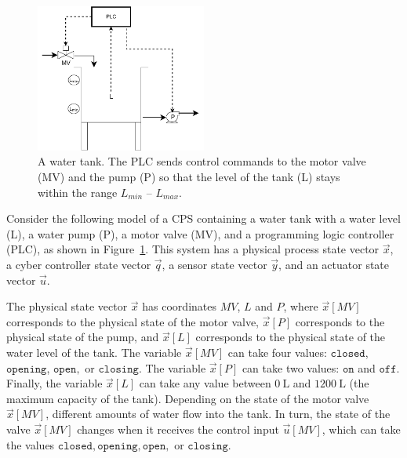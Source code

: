 \begin{figure}
  \centering
  \includegraphics[width=0.50\textwidth]{Figures/FillingTank.pdf}
  \caption{A water tank. The PLC sends control commands to the motor valve (MV) and the pump (P) so that the level of the tank (L) stays within the range $L_{min}$ -- $L_{max}$. }
  \label{fig:CPSRobustness:Motivational}
\end{figure}
Consider the following model of a CPS containing a water tank with a water level (L), a water pump (P), a motor valve (MV), and a programming logic controller (PLC), as shown in Figure~\ref{fig:CPSRobustness:Motivational}. This system has a physical process state vector $\vec{x}$, a cyber controller state vector $\vec{q}$, a sensor state vector $\vec{y}$, and an actuator state vector $\vec{u}$.

The physical state vector $\vec{x}$ has coordinates $MV$, $L$ and $P$, where $\vec{x}[MV]$ corresponds to the physical state of the motor valve, $\vec{x}[P]$ corresponds to the physical state of the pump, and $\vec{x}[L]$  corresponds to the physical state of the water level of the tank. The variable $\vec{x}[MV]$ can take four values: $\texttt{closed}$, $\texttt{opening}$, $\texttt{open},$ or $\texttt{closing}$. The variable $\vec{x}[P]$ can take two values: $\texttt{on}$ and $\texttt{off}$. Finally, the variable $\vec{x}[L]$ can take any value between $0 ~\mathrm{L}$ and $1200 ~\mathrm{L}$ (the maximum capacity of the tank). %
Depending on the state of the motor valve $\vec{x}[MV]$, different amounts of water flow into the tank. In turn, the state of the valve $\vec{x}[MV]$ changes when it receives the control input $\vec{u}[MV]$, which can take the values $\texttt{closed}, \texttt{opening},\texttt{open},$ or $\texttt{closing}$.  

